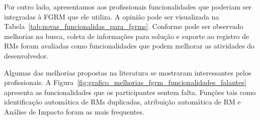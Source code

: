 Por outro lado, apresentamos aos profissionais funcionalidades que poderiam ser
integradas à FGRM que ele utiliza. A opinião pode ser visualizada na
Tabela~\ref{tab:novas_funcionalidas_para_fgrms}. Conforme pode ser observado
melhorias na busca, coleta de informações para solução e suporte ao registro de
RMs foram avaliadas como funcionalidades que podem melhorar as atividades do
desenvolvedor.

\begin{table}[htpb]
\centering
{}
\caption{Novas Funcionalidades para as FGRMs}
\label{tab:novas_funcionalidas_para_fgrms}
\end{table}

Algumas das melhorias propostas na literatura se mostraram interessantes pelos
profissionais. A
Figura~\ref{fig:grafico_melhorias_fgrm_funcionalidades_falantes} apresenta as
funcionalidades que os participantes sentem falta. Funções tais como
identificação automática de RMs duplicadas, atribuição automática de RM e
Análise de Impacto foram as mais frequentes.

